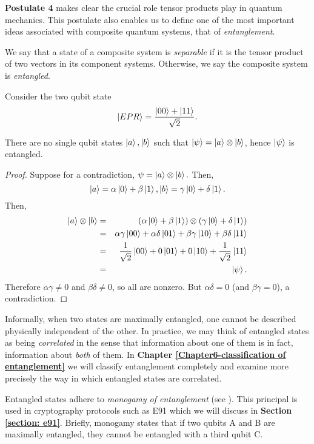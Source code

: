 {\bf{Postulate 4}} makes clear the crucial role tensor products play in quantum mechanics.  This postulate also enables us to define one of the most important ideas associated with composite quantum systems, that of \textit{entanglement}. 


\begin{definition}\label{definition: entanglement with state vector}
We say that a state of a composite system is \textit{separable} if it is the tensor product of two vectors in its component systems. Otherwise, we say the composite system is \textit{entangled}.
\end{definition}


\begin{example} \label{example: entangled state}
Consider the two qubit state 
\begin{equation}\label{eqn: epr}
    \ket{EPR}=\frac{\ket{00}+\ket{11}}{\sqrt{2}}.
\end{equation}

There are no single qubit states $\ket{a}, \ket{b}$ such that $\ket{\psi}=\ket{a}\otimes \ket{b}$, hence $\ket{\psi}$ is entangled.
\begin{proof}
Suppose for a contradiction, $\psi = \ket{a} \otimes \ket{b}.$  Then, 
$$\ket{a}=\alpha \ket{0}+\beta \ket{1}, \ket{b}=\gamma\ket{0}+\delta\ket{1}.$$
Then,
\begin{eqnarray}
\ket{a}\otimes \ket{b} &=& (\alpha \ket{0}+\beta \ket{1}) \otimes (\gamma\ket{0}+\delta\ket{1})\\
&=& \alpha \gamma \ket{00}+\alpha \delta \ket{01}+\beta \gamma\ket{10}+\beta\delta\ket{11}\\
&=&\frac{1}{\sqrt{2}}\ket{00}+0\ket{01}+0\ket{10}+\frac{1}{\sqrt{2}}\ket{11}\\
&=&\ket{\psi}.
\end{eqnarray}
Therefore $\alpha \gamma \neq 0$ and $\beta \delta \neq 0$, so all are nonzero.  But $\alpha \delta =0$ (and $\beta \gamma=0$), a contradiction.
\end{proof}
\end{example}


Informally, when two states are maximally entangled, one cannot be described physically independent of the other.  In practice, we may think of entangled states as being {\emph{correlated}} in the sense that information about one of them is in fact, information about {\emph{both}} of them. In {\bf{Chapter} \ref{Chapter6-classification of entanglement}} we will classify entanglement completely and examine more precisely the way in which entangled states are correlated. 

Entangled states adhere to {\emph{monogamy of entanglement}} (see \cite{Toner2006}).  This principal is used in cryptography protocols such as E91 which we will discuss in \textbf{Section \ref{section: e91}}. Briefly, monogamy states that if two qubits A and B are maximally entangled, they cannot be entangled with a third qubit C. 


